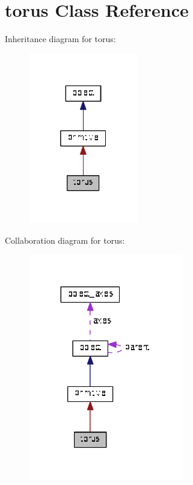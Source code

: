 \hypertarget{classtorus}{}\section{torus Class Reference}
\label{classtorus}


Inheritance diagram for torus\+:\nopagebreak
\begin{figure}[H]
\begin{center}
\leavevmode
\includegraphics[width=136pt]{classtorus__inherit__graph}
\end{center}
\end{figure}


Collaboration diagram for torus\+:\nopagebreak
\begin{figure}[H]
\begin{center}
\leavevmode
\includegraphics[width=191pt]{classtorus__coll__graph}
\end{center}
\end{figure}
